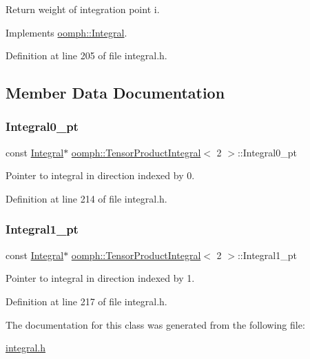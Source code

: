 Return weight of integration point i. 



Implements \hyperlink{classoomph_1_1Integral_ac65335e2aab120b285b3d6c294507b06}{oomph\+::\+Integral}.



Definition at line 205 of file integral.\+h.



\subsection{Member Data Documentation}
\mbox{\label{classoomph_1_1TensorProductIntegral_3_012_01_4_a9f009fce849704b680b2b79ceaaf83b9}} 
\subsubsection{\texorpdfstring{Integral0\+\_\+pt}{Integral0\_pt}}
{\footnotesize\ttfamily const \hyperlink{classoomph_1_1Integral}{Integral}$\ast$ \hyperlink{classoomph_1_1TensorProductIntegral}{oomph\+::\+Tensor\+Product\+Integral}$<$ 2 $>$\+::Integral0\+\_\+pt\hspace{0.3cm}{\ttfamily [private]}}



Pointer to integral in direction indexed by 0. 



Definition at line 214 of file integral.\+h.

\mbox{\label{classoomph_1_1TensorProductIntegral_3_012_01_4_a410c83f19a1328c65d0753882f95b529}} 
\subsubsection{\texorpdfstring{Integral1\+\_\+pt}{Integral1\_pt}}
{\footnotesize\ttfamily const \hyperlink{classoomph_1_1Integral}{Integral}$\ast$ \hyperlink{classoomph_1_1TensorProductIntegral}{oomph\+::\+Tensor\+Product\+Integral}$<$ 2 $>$\+::Integral1\+\_\+pt\hspace{0.3cm}{\ttfamily [private]}}



Pointer to integral in direction indexed by 1. 



Definition at line 217 of file integral.\+h.



The documentation for this class was generated from the following file\+:\begin{DoxyCompactItemize}
\item 
\hyperlink{integral_8h}{integral.\+h}\end{DoxyCompactItemize}
